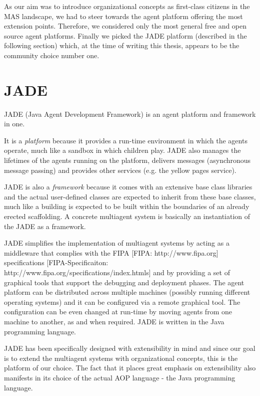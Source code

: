 As our aim was to introduce organizational concepts as first-class citizens in the MAS landscape, we had to steer towards the agent platform offering the most extension points.
Therefore, we considered only the most general free and open source agent platforms.
Finally we picked the JADE platform (described in the following section) which, at the time of writing this thesis, appears to be the community choice number one.  

\section{JADE}

JADE (Java Agent Development Framework) is an agent platform and framework in one.

It is a \textit{platform} because it provides a run-time environment in which the agents operate, much like a sandbox in which children play.
JADE also manages the lifetimes of the agents running on the platform, delivers messages (asynchronous message passing) and provides other services (e.g. the yellow pages service).

JADE is also a \textit{framework} because it comes with an extensive base class libraries and the actual user-defined classes are expected to inherit from these base classes, much like a building is expected to be built within the boundaries of an already erected scaffolding.
A concrete multiagent system is basically an instantiation of the JADE as a framework.

JADE simplifies the implementation of multiagent systems by acting as a middleware that complies with the FIPA
[FIPA: http://www.fipa.org]
specifications
[FIPA-Specificaiton: http://www.fipa.org/specifications/index.htmls] and by providing a set of graphical tools that support the debugging and deployment phases.
The agent platform can be distributed across multiple machines (possibly running different operating systems) and it can be configured via a remote graphical tool.
The configuration can be even changed at run-time by moving agents from one machine to another, as and when required. 
JADE is written in the Java programming language. 

JADE has been specifically designed with extensibility in mind and since our goal is to extend the multiagent systems with organizational concepts, this is the platform of our choice.
The fact that it places great emphasis on extensibility also manifests in its choice of the actual AOP language - the Java programming language.

